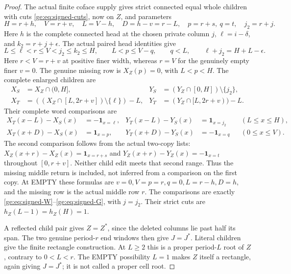 \documentclass[11pt,a4paper]{amsart}
\numberwithin{equation}{section}
\theoremstyle{plain}
\theoremstyle{definition}
\newcommand{\one}{\mathbf1}
\begin{document}
\begin{proof}
The actual finite coface supply  gives
strict connected equal whole children with cuts
\eqref{ge:eq:signed-cuts}, now on \(Z\), and parameters
\[
 H=r+h,\quad V=r+v,\quad L=V-h,\quad D=h-v=r-L,
 \quad p=r+s,\ q=t,\quad j_2=r+j.
\]
Here \(h\) is the complete connected head at the chosen private
column \(j\), \(\ell=i-\delta\), and
\(k_2=r+j+\epsilon\).  The actual paired head identities give
\[
 L\le\ell<r\le V<j_2\le k_2\le H,\qquad
 L<p\le V-q,\qquad q<L,\qquad
 \ell+j_2=H+L-\epsilon.
\]
Here \(r<V=r+v\) at positive finer width, whereas \(r=V\) for
the genuinely empty finer \(v=0\).
The genuine missing row is \(X_Z(p)=0\), with \(L<p<H\).
The complete enlarged children are
\begin{equation}\label{ge:eq:ordinary-private-cuts}
\begin{aligned}
 X_S&=X_Z\cap(0,H],&
 Y_S&=(Y_Z\cap[0,H])\setminus\{j_2\},\\
 X_T&=((X_Z\cap[L,2r+v])\setminus\{\ell\})-L,&
 Y_T&=(Y_Z\cap[L,2r+v))-L.
\end{aligned}
\end{equation}
Their complete word comparisons are
\begin{align}
 X_T(x-L)-X_S(x)&=-\one_{x=\ell},&
 Y_T(x-L)-Y_S(x)&=\one_{x=j_2}&&(L\le x\le H),
 \label{ge:eq:ordinary-private-shared}\\
 X_T(x+D)-X_S(x)&=\one_{x=p},&
 Y_T(x+D)-Y_S(x)&=-\one_{x=q}&&(0\le x\le V).
 \label{ge:eq:ordinary-private-second}
\end{align}
The second comparison follows from the actual two-copy lists:
\(X_Z(x+r)-X_Z(x)=\one_{x=r+s}\) and
\(Y_Z(x+r)-Y_Z(x)=-\one_{x=t}\) throughout \([0,r+v]\).
Neither child edit meets that second range.  Thus the missing middle
return is included, not inferred from a comparison on the first copy.  At EMPTY these formulas are
\(v=0,V=p=r,q=0,L=r-h,D=h\), and the missing row is the actual
middle row \(r\).  The comparisons are exactly
\eqref{ge:eq:signed-W}--\eqref{ge:eq:signed-G}, with \(j=j_2\).
Their strict cuts are \(h_Z(L-1)=h_Z(H)=1\).

A reflected child pair gives \(Z=Z^*\), since the deleted columns lie
past half its span.  The two genuine period-\(r\) end windows then give
\(J=J^*\).  Literal children give the finite rectangle construction.
At \(L\ge2\) this is a proper period-\(L\) root of \(Z\), contrary
to \(0<L<r\).  The EMPTY possibility \(L=1\) makes \(Z\) itself a
rectangle, again giving \(J=J^*\); it is not called a proper cell root.


\end{proof}
\end{document}
